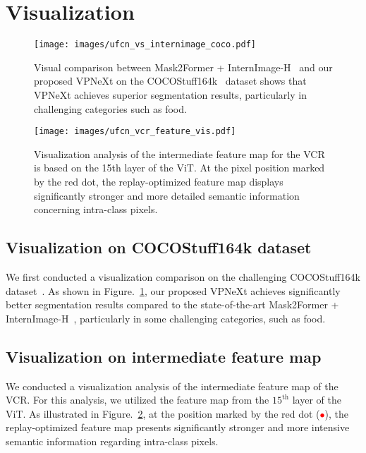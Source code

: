 \section{Visualization}

\begin{figure}[ht!]
    \centering
    \texttt{[image: images/ufcn\_vs\_internimage\_coco.pdf]}
    \caption{Visual comparison between Mask2Former + InternImage-H~\cite{cMask2Former,cInternImage} and our proposed VPNeXt on the COCOStuff164k~\cite{cCocoStuff} dataset shows that VPNeXt achieves superior segmentation results, particularly in challenging categories such as food.}
    \label{fig:cocostuff_internimage_vs_vpnext}
\end{figure}



\begin{figure}[ht!]
    \centering
    \texttt{[image: images/ufcn\_vcr\_feature\_vis.pdf]}
    \caption{Visualization analysis of the intermediate feature map for the VCR is based on the 15th layer of the ViT. At the pixel position marked by the red dot, the replay-optimized feature map displays significantly stronger and more detailed semantic information concerning intra-class pixels.}
    \label{fig:vcr_feature_vis}
\end{figure}



\subsection{Visualization on COCOStuff164k dataset}
We first conducted a visualization comparison on the challenging COCOStuff164k dataset~\cite{cCocoStuff}. 
As shown in Figure.~\ref{fig:cocostuff_internimage_vs_vpnext}, our proposed VPNeXt achieves significantly better segmentation results compared to the state-of-the-art Mask2Former + InternImage-H~\cite{cMask2Former,cInternImage}, particularly in some challenging categories, such as food.

\subsection{Visualization on intermediate feature map}
We conducted a visualization analysis of the intermediate feature map of the VCR. 
%
For this analysis, we utilized the feature map from the $15^{\text{th}}$ layer of the ViT. 
As illustrated in Figure.~\ref{fig:vcr_feature_vis}, at the position marked by the red dot (\textcolor{red}{$\bullet$}), the replay-optimized feature map presents significantly stronger and more intensive semantic information regarding intra-class pixels.


